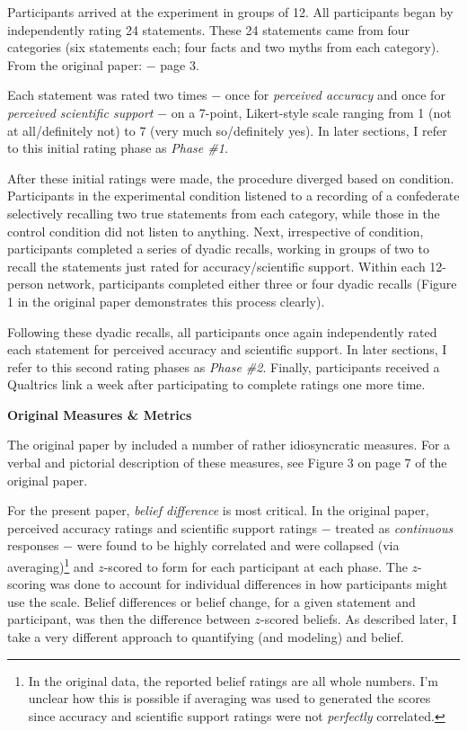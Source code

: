 \documentclass[12pt]{article}  %
\begin{document}
Participants arrived at the experiment in groups of 12. All participants began by independently rating 24 statements. These 24 statements came from four categories (six statements each; four facts and two myths from each category). From the original paper:  $-$ page 3.

Each statement was rated two times $-$ once for \textit{perceived accuracy} and once for \textit{perceived scientific support} $-$ on a 7-point, Likert-style scale ranging from 1 (not at all/definitely not) to 7 (very much so/definitely yes). In later sections, I refer to this initial rating phase as \textit{Phase \#1}.

After these initial ratings were made, the procedure diverged based on condition. Participants in the experimental condition listened to a recording of a confederate selectively recalling two true statements from each category, while those in the control condition did not listen to anything. Next, irrespective of condition, participants completed a series of dyadic recalls, working in groups of two to recall the statements just rated for accuracy/scientific support. Within each 12-person network, participants completed either three or four dyadic recalls (Figure 1 in the original paper demonstrates this process clearly).

Following these dyadic recalls, all participants once again independently rated each statement for perceived accuracy and scientific support. In later sections, I refer to this second rating phases as \textit{Phase \#2}. Finally, participants received a Qualtrics link a week after participating to complete ratings one more time.

\noindent\textbf{Original Measures \& Metrics}

The original paper by \textcite{vlasceanu_synchronization_2020} included a number of rather idiosyncratic measures. For a verbal and pictorial description of these measures, see Figure 3 on page 7 of the original paper.

For the present paper, \textit{belief difference} is most critical. In the original paper, perceived accuracy ratings and scientific support ratings $-$ treated as \textit{continuous} responses $-$ were found to be highly correlated and were collapsed (via averaging)\footnote{In the original data, the reported belief ratings are all whole numbers. I'm unclear how this is possible if averaging was used to generated the scores since accuracy and scientific support ratings were not \textit{perfectly} correlated.} and $z$-scored to form  for each participant at each phase. The $z$-scoring was done to account for individual differences in how participants might use the scale. Belief differences or belief change, for a given statement and participant, was then the difference between $z$-scored beliefs. As described later, I take a very different approach to quantifying (and modeling) and belief.
\end{document}
